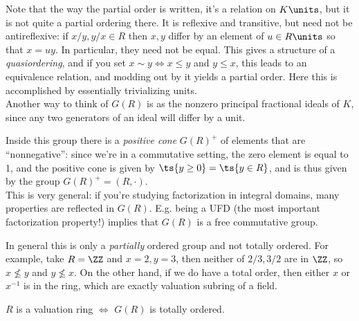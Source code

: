 \begin{remark}

Note that the way the partial order is written, it's a relation on
\(K\units\), but it is not quite a partial ordering there. It is
reflexive and transitive, but need not be antireflexive: if
\(x/y, y/x\in R\) then \(x,y\) differ by an element of \(u\in R\units\)
so that \(x=uy\). In particular, they need not be equal. This gives a
structure of a \emph{quasiordering}, and if you set
\(x\sim y \iff x\leq y\) and \(y\leq x\), this leads to an equivalence
relation, and modding out by it yields a partial order. Here this is
accomplished by essentially trivializing units.\\

Another way to think of \(G(R)\) is as the nonzero principal fractional
ideals of \(K\), since any two generators of an ideal will differ by a
unit.

\end{remark}

\begin{remark}

Inside this group there is a \emph{positive cone} \(G(R)^+\) of elements
that are ``nonnegative'': since we're in a commutative setting, the zero
element is equal to 1, and the positive cone is given by
\(\ts{y\geq 0} = \ts{y\in R}\), and is thus given by the group
\(G(R)^+ = (R, \cdot)\).\\

This is very general: if you're studying factorization in integral
domains, many properties are reflected in \(G(R)\). E.g. being a UFD
(the most important factorization property!) implies that \(G(R)\) is a
free commutative group.

\end{remark}

\begin{remark}

In general this is only a \emph{partially} ordered group and not totally
ordered. For example, take \(R = \ZZ\) and \(x=2, y=3\), then neither of
\(2/3, 3/2\) are in \(\ZZ\), so \(x\not\leq y\) and \(y\not\leq x\). On
the other hand, if we do have a total order, then either \(x\) or
\(x^{-1}\) is in the ring, which are exactly valuation subring of a
field.

\end{remark}

\begin{claim}

\(R\) is a valuation ring \(\iff\) \(G(R)\) is totally ordered.

\end{claim}

